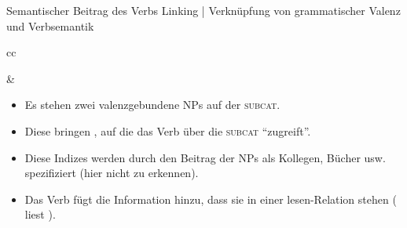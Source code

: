 \begin{frame}
  {Semantischer Beitrag des Verbs}
  \onslide<+->
  \onslide<+->
  \alert{Linking} | Verknüpfung von grammatischer Valenz und Verbsemantik\\
  \onslide<+->
  \Zeile
  \begin{tabular}{cc}
    \begin{minipage}{0.5\textwidth}
    \end{minipage} & %
    \begin{minipage}{0.4\textwidth}
      \begin{itemize}[<+->]\footnotesize
        \item Es stehen zwei valenzgebundene NPs auf der \textsc{subcat}.
        \item Diese bringen , auf die das Verb über die \textsc{subcat} "`zugreift"'.
        \item Diese Indizes werden durch den Beitrag der NPs als Kollegen, Bücher usw. spezifiziert (hier nicht zu erkennen).
        \item Das Verb fügt die \alert{Information hinzu, dass sie in einer lesen-Relation stehen ( liest )}.
      \end{itemize}
    \end{minipage} \\
  \end{tabular}
\end{frame}

